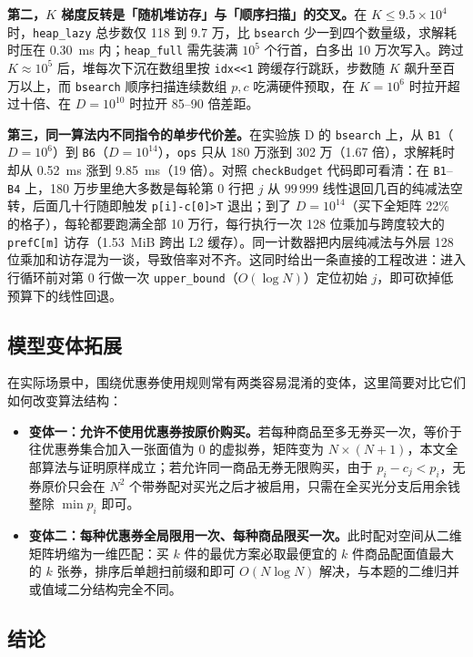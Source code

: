 \documentclass[12pt,a4paper,fontset=windows]{ctexart}
\theoremstyle{plain}
\newcommand{\code}[1]{\texttt{#1}}
\begin{document}
\textbf{第二，$K$ 梯度反转是「随机堆访存」与「顺序扫描」的交叉。}在 $K \le 9.5\times 10^4$ 时，\code{heap\_lazy} 总步数仅 118 到 9.7 万，比 \code{bsearch} 少一到四个数量级，求解耗时压在 0.30~ms 内；\code{heap\_full} 需先装满 $10^5$ 个行首，白多出 10 万次写入。跨过 $K \approx 10^5$ 后，堆每次下沉在数组里按 \code{idx<<1} 跨缓存行跳跃，步数随 $K$ 飙升至百万以上，而 \code{bsearch} 顺序扫描连续数组 $p, c$ 吃满硬件预取，在 $K=10^6$ 时拉开超过十倍、在 $D=10^{10}$ 时拉开 85--90 倍差距。

\textbf{第三，同一算法内不同指令的单步代价差。}在实验族 D 的 \code{bsearch} 上，从 \code{B1}（$D=10^6$）到 \code{B6}（$D=10^{14}$），\code{ops} 只从 180 万涨到 302 万（1.67 倍），求解耗时却从 0.52~ms 涨到 9.85~ms（19 倍）。对照 \code{checkBudget} 代码即可看清：在 \code{B1}--\code{B4} 上，180 万步里绝大多数是每轮第 0 行把 $j$ 从 $99\,999$ 线性退回几百的纯减法空转，后面几十行随即触发 \code{p[i]-c[0]>T} 退出；到了 $D=10^{14}$（买下全矩阵 22\% 的格子），每轮都要跑满全部 10 万行，每行执行一次 128 位乘加与跨度较大的 \code{prefC[m]} 访存（1.53~MiB 跨出 L2 缓存）。同一计数器把内层纯减法与外层 128 位乘加和访存混为一谈，导致倍率对不齐。这同时给出一条直接的工程改进：进入行循环前对第 0 行做一次 \code{upper\_bound}（$O(\log N)$）定位初始 $j$，即可砍掉低预算下的线性回退。

\subsection{模型变体拓展}

在实际场景中，围绕优惠券使用规则常有两类容易混淆的变体，这里简要对比它们如何改变算法结构：

\begin{itemize}[leftmargin=1.6em,itemsep=0.18em,topsep=0.18em]
  \item \textbf{变体一：允许不使用优惠券按原价购买。}若每种商品至多无券买一次，等价于往优惠券集合加入一张面值为 0 的虚拟券，矩阵变为 $N\times(N+1)$，本文全部算法与证明原样成立；若允许同一商品无券无限购买，由于 $p_i - c_j < p_i$，无券原价只会在 $N^2$ 个带券配对买光之后才被启用，只需在全买光分支后用余钱整除 $\min p_i$ 即可。
  \item \textbf{变体二：每种优惠券全局限用一次、每种商品限买一次。}此时配对空间从二维矩阵坍缩为一维匹配：买 $k$ 件的最优方案必取最便宜的 $k$ 件商品配面值最大的 $k$ 张券，排序后单趟扫前缀和即可 $O(N\log N)$ 解决，与本题的二维归并或值域二分结构完全不同。
\end{itemize}

\subsection{结论}
\end{document}
